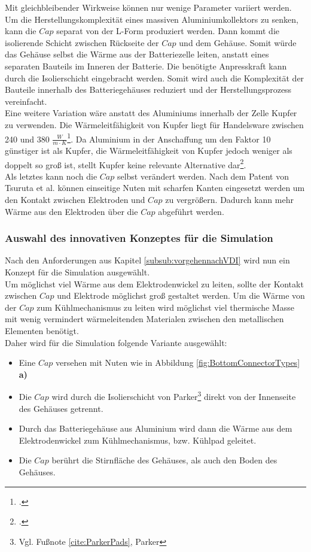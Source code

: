 Mit gleichbleibender Wirkweise können nur wenige Parameter variiert werden. \\
Um die Herstellungskomplexität eines massiven Aluminiumkollektors zu senken, kann die $Cap$ separat von der L-Form produziert werden. Dann kommt die isolierende Schicht zwischen Rückseite der $Cap$ und dem Gehäuse. Somit würde das Gehäuse selbst die Wärme aus der Batteriezelle leiten, anstatt eines separaten Bauteils im Inneren der Batterie. Die benötigte Anpresskraft kann durch die Isolierschicht eingebracht werden. Somit wird auch die Komplexität der Bauteile innerhalb des Batteriegehäuses reduziert und der Herstellungsprozess vereinfacht.\\
Eine weitere Variation wäre anstatt des Aluminiums innerhalb der Zelle Kupfer zu verwenden. Die Wärmeleitfähigkeit von Kupfer liegt für Handelsware zwischen 240 und 380 $\frac{W}{m \cdot K}$\footcite[Vgl.][]{Myers.2009}. Da Aluminium in der Anschaffung um den Faktor 10 günstiger ist als Kupfer, die Wärmeleitfähigkeit von Kupfer jedoch weniger als doppelt so groß ist, stellt Kupfer keine relevante Alternative dar\footcite[Vgl.][]{Doduco.2021}.\\
Als letztes kann noch die $Cap$ selbst verändert werden. Nach dem Patent von Tsuruta et al. können einseitige Nuten mit scharfen Kanten eingesetzt werden um den Kontakt zwischen Elektroden und $Cap$ zu vergrößern. Dadurch kann mehr Wärme aus den Elektroden über die $Cap$ abgeführt werden.

\subsubsection*{Auswahl des innovativen Konzeptes für die Simulation}

Nach den Anforderungen aus Kapitel \ref{subsub:vorgehennachVDI} wird nun ein Konzept für die Simulation ausgewählt.\\
Um möglichst viel Wärme aus dem Elektrodenwickel zu leiten, sollte der Kontakt zwischen $Cap$ und Elektrode möglichst groß gestaltet werden. Um die Wärme von der $Cap$ zum Kühlmechanismus zu leiten wird möglichst viel thermische Masse mit wenig vermindert wärmeleitenden Materialen zwischen den metallischen Elementen benötigt.\\ 
Daher wird für die Simulation folgende Variante ausgewählt:\\

\begin{itemize}
	\item Eine $Cap$ versehen mit Nuten wie in Abbildung \ref{fig:BottomConnectorTypes} \textbf{a)}
	\item Die $Cap$ wird durch die Isolierschicht von Parker\footnote{Vgl. Fußnote \ref{cite:ParkerPads}, Parker} direkt von der Innenseite des Gehäuses getrennt.
	\item Durch das Batteriegehäuse aus Aluminium wird dann die Wärme aus dem Elektrodenwickel zum Kühlmechanismus, bzw. Kühlpad geleitet.
	\item Die $Cap$ berührt die Stirnfläche des Gehäuses, als auch den Boden des Gehäuses.
\end{itemize}


